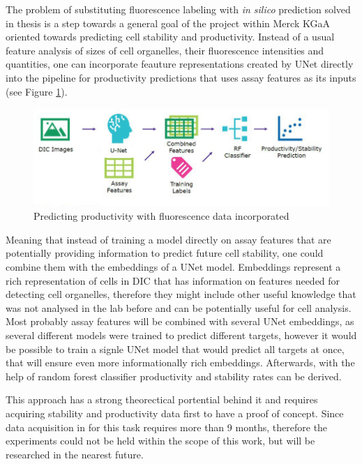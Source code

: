The problem of substituting fluorescence labeling with \textit{in silico} prediction solved in thesis is a step towards a general goal of the project within Merck KGaA oriented towards predicting cell stability and productivity. Instead of a usual feature analysis of sizes of cell organelles, their fluorescence intensities and quantities, one can incorporate feauture representations created by UNet directly into the pipeline for productivity predictions that uses assay features as its inputs (see Figure \ref{fig:productivity-fluroescence}).
\begin{figure}[htb]
	\begin{center}
		\includegraphics[width=\linewidth]{bilder/unet-embeddings/producitvity.png}
		\caption{Predicting productivity with fluorescence data incorporated}
		\label{fig:productivity-fluroescence}
	\end{center}
\end{figure}

Meaning that instead of training a model directly on assay features that are potentially providing information to predict future cell stability, one could combine them with the embeddings of a UNet model. Embeddings represent a rich representation of cells in DIC that has information on features needed for detecting cell organelles, therefore they might include other useful knowledge that was not analysed in the lab before and can be potentially useful for cell analysis. Most probably assay features will be combined with several UNet embeddings, as several different models were trained to predict different targets, however it would be possible to train a signle UNet model that would predict all targets at once, that will ensure even more informationally rich embeddings. Afterwards, with the help of random forest classifier productivity and stability rates can be derived. 

This approach has a strong theorectical portential behind it and requires acquiring stability and productivity data first to have a proof of concept. Since data acquisition in for this task requires more than 9 months, therefore the experiments could not be held within the scope of this work, but will be researched in the nearest future.